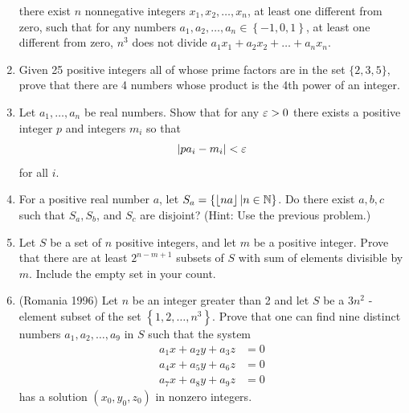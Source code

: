 \begin{enumerate}
there exist $n$ nonnegative integers $x_{1},x_{2},\ldots,x_{n}$, at least one
different from zero, such that for any numbers $a_{1},a_{2},\ldots,a_{n}
\in\left\{  -1,0,1\right\}$, at least one different from zero, $n^{3}$ does
not divide $a_{1}x_{1}+a_{2}x_{2}+\ldots+a_{n}x_{n}$.
\item Given 25 positive integers all of whose prime factors are in the set $\{2,3,5\}$, prove that there are 4 numbers whose product is the 4th power of an integer.
\item Let $a_1,\ldots, a_n$ be real numbers. Show that for any $\varepsilon>0$ there exists a positive integer $p$ and integers $m_i$ so that
\[|pa_i-m_i|<\varepsilon\]
for all $i$. 
\item For a positive real number $a$, let $S_a=\{\left\lfloor {na}\right\rfloor|n\in \mathbb{N}\}$. Do there exist $a,b,c$ such that $S_a,S_b$, and $S_c$ are disjoint? (Hint: Use the previous problem.)
\item Let $S$ be a set of $n$ positive integers, and let $m$ be a positive integer. Prove that there are at least $2^{n-m+1}$ subsets of $S$ with sum of elements divisible by $m$. Include the empty set in your count. 
\item (Romania 1996) Let $n$ be an integer greater than 2 and let $S$ be a $3n^2$ - element subset of the set $\left\{1,2,\ldots,n^3\right\}$. Prove that one can find nine distinct numbers $a_{1},a_{2},\ldots,a_{9}$ in $S$ such that the system
\begin{align*}
a_{1}x+a_{2}y+a_{3}z&=0\\
a_{4}x+a_{5}y+a_{6}z&=0\\
a_{7}x+a_{8}y+a_{9}z&=0
\end{align*}
has a solution $(x_{0},y_{0},z_{0})$ in nonzero integers.


\end{enumerate}
